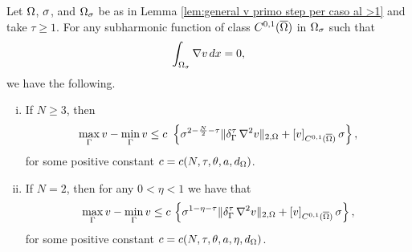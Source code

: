 \documentclass[a4paper,10pt]{amsart}
\numberwithin{equation}{section}
\begin{document}
\begin{cor}\label{cor:general v secondo step per caso al>1}
		Let $\Omega$, $\sigma$, and $\Omega_\sigma$ be as in Lemma \ref{lem:general v primo step per caso al >1} and take $\tau\ge 1$.
		For any subharmonic function of class $C^{0,1}( \overline{ \Omega } )$ in $\Omega_\sigma$ such that
		\begin{equation*}
		\int_{\Omega_\sigma} \nabla v \, dx = 0,	
		\end{equation*}
we have the following.
\begin{enumerate}[(i)]
\item 
If $N\ge 3$, then		
\begin{equation*}
\max_{\Gamma} v - \min_{\Gamma} v \le c  \, \, \left\{ \sigma^{2-\frac{N}{2} -\tau} \Vert \delta_{\Gamma}^\tau\, \nabla^2 v \Vert_{2, \Omega} + \left[ v \right]_{C^{0,1}(\overline{\Omega})} \sigma \right\} ,
\end{equation*}
for some positive constant  $c=c(N, \tau, \theta, a, d_\Omega)$.
\item 
If $N=2$, then for any $0<\eta<1$ we have that
		\begin{equation*}
		\max_{\Gamma} v - \min_{\Gamma} v \le  c    \, \left\{ \sigma^{1- \eta -\tau} \Vert \delta_{\Gamma}^\tau\, \nabla^2 v \Vert_{2, \Omega} + \left[ v \right]_{C^{0,1}(\overline{\Omega})} \sigma \right\} ,	
		\end{equation*}
for some positive constant $c=c(N, \tau, \theta, a, \eta , d_\Omega )$.
	\end{enumerate}
\end{cor}
\end{document}
